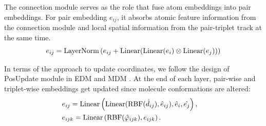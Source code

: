 \documentclass[letterpaper]{article} %
\begin{document}
The connection module serves as the role that fuse atom embeddings into pair embeddings. For pair embedding $e_{ij}$, it absorbs atomic feature information from the connection module and local spatial information from the pair-triplet track at the same time.
\begin{equation}
    e_{ij} = {\rm LayerNorm}\left(e_{ij} + {\rm Linear}({\rm Linear}(e_i) \otimes {\rm Linear}(e_j))\right)
\end{equation}

In terms of the approach to update coordinates, we follow the design of PosUpdate module in EDM \cite{edm_22_hoogeboom} and MDM \cite{mdm_23_huang}. At the end of each layer, pair-wise and triplet-wise embeddings get updated since molecule conformations are altered:
\begin{eqnarray}
    &e_{ij} = {\rm Linear}\left({\rm Linear}({\rm RBF}(\hat{d}_{ij}), \hat{e}_{ij}), \hat{e}_i, \hat{e_j}\right),&\\
    &e_{ijk} = {\rm Linear}\left({\rm RBF}(\hat{\varphi}_{ijk}), e_{ijk}\right). &
\end{eqnarray}
\end{document}
